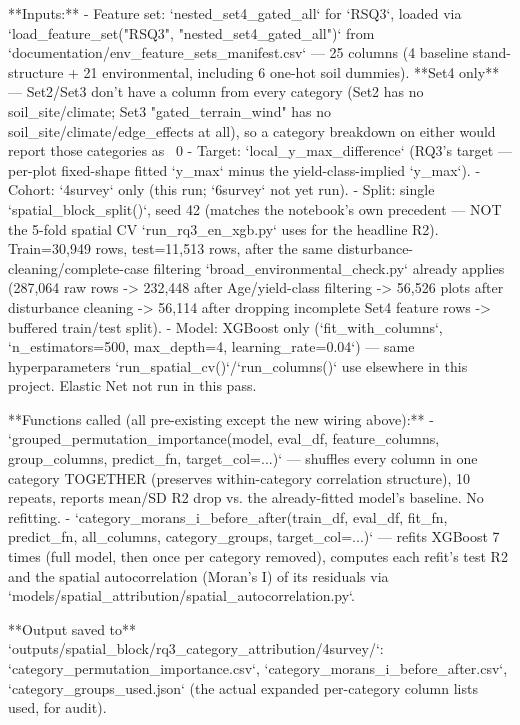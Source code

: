 **Inputs:**
- Feature set: `nested_set4_gated_all` for `RSQ3`, loaded via
  `load_feature_set("RSQ3", "nested_set4_gated_all")` from
  `documentation/env_feature_sets_manifest.csv` — 25 columns (4 baseline stand-structure +
  21 environmental, including 6 one-hot soil dummies). **Set4 only** — Set2/Set3 don't have a
  column from every category (Set2 has no soil_site/climate; Set3 "gated_terrain_wind" has no
  soil_site/climate/edge_effects at all), so a category breakdown on either would report those
  categories as ~0%
- Target: `local_y_max_difference` (RQ3's target — per-plot fixed-shape fitted `y_max` minus the
  yield-class-implied `y_max`).
- Cohort: `4survey` only (this run; `6survey` not yet run).
- Split: single `spatial_block_split()`, seed 42 (matches the notebook's own precedent — NOT the
  5-fold spatial CV `run_rq3_en_xgb.py` uses for the headline R2). Train=30,949 rows, test=11,513
  rows, after the same disturbance-cleaning/complete-case filtering `broad_environmental_check.py`
  already applies (287,064 raw rows -> 232,448 after Age/yield-class filtering -> 56,526 plots
  after disturbance cleaning -> 56,114 after dropping incomplete Set4 feature rows -> buffered
  train/test split).
- Model: XGBoost only (`fit_with_columns`, `n_estimators=500, max_depth=4, learning_rate=0.04`) —
  same hyperparameters `run_spatial_cv()`/`run_columns()` use elsewhere in this project. Elastic
  Net not run in this pass.

**Functions called (all pre-existing except the new wiring above):**
- `grouped_permutation_importance(model, eval_df, feature_columns, group_columns, predict_fn, target_col=...)`
  — shuffles every column in one category TOGETHER (preserves within-category correlation
  structure), 10 repeats, reports mean/SD R2 drop vs. the already-fitted model's baseline. No
  refitting.
- `category_morans_i_before_after(train_df, eval_df, fit_fn, predict_fn, all_columns, category_groups, target_col=...)`
  — refits XGBoost 7 times (full model, then once per category removed), computes each refit's
  test R2 and the spatial autocorrelation (Moran's I) of its residuals via
  `models/spatial_attribution/spatial_autocorrelation.py`.

**Output saved to** `outputs/spatial_block/rq3_category_attribution/4survey/`:
`category_permutation_importance.csv`, `category_morans_i_before_after.csv`,
`category_groups_used.json` (the actual expanded per-category column lists used, for audit).

